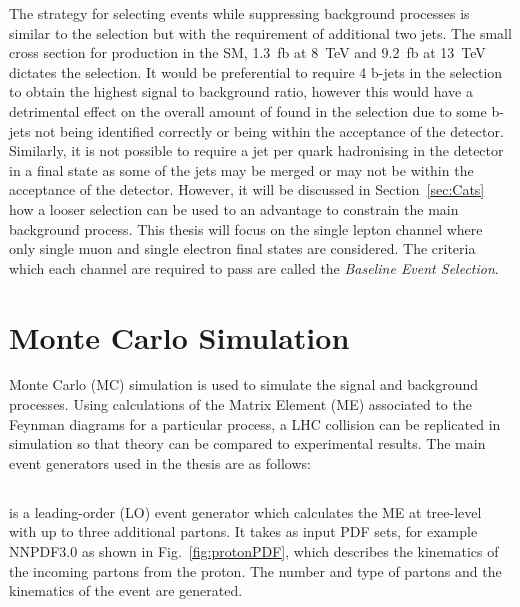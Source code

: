 The strategy for selecting \tttt events while suppressing background processes is similar to the \ttbar selection but with the requirement of additional two jets. The small cross section for \tttt production in the SM, 1.3~fb at 8~TeV and 9.2~fb at 13~TeV~\cite{Alwall2014,Bevilacqua2012} dictates the selection. It would be preferential to require 4 b-jets in the selection to obtain the highest signal to background ratio, however this would have a detrimental effect on the overall amount of \tttt found in the selection due to some b-jets not being identified correctly or being within the acceptance of the detector. Similarly, it is not possible to require a jet per quark hadronising in the detector in a \tttt final state as some of the jets may be merged or may not be within the acceptance of the detector. However, it will be discussed in Section~\ref{sec:Cats} how a looser selection can be used to an advantage to constrain the main background process.
This thesis will focus on the single lepton channel where only single muon and single electron final states are considered. 
The criteria which each channel are required to pass are called the \emph{Baseline Event Selection}.



\section{Monte Carlo Simulation}

Monte Carlo (MC) simulation is used to simulate the signal and background processes. Using calculations of the Matrix Element (ME) associated to the Feynman diagrams for a particular process, a LHC collision can be replicated in simulation so that theory can be compared to experimental results. The main event generators used in the thesis are as follows:

\subsection{\MADGRAPH}
\MADGRAPH is a leading-order (LO) event generator which calculates the ME at tree-level with up to three additional partons. It takes as input PDF sets, for example NNPDF3.0 as shown in Fig.~\ref{fig:protonPDF}, which describes the kinematics of the incoming partons from the proton. The number and type of partons and the kinematics of the event are generated.
